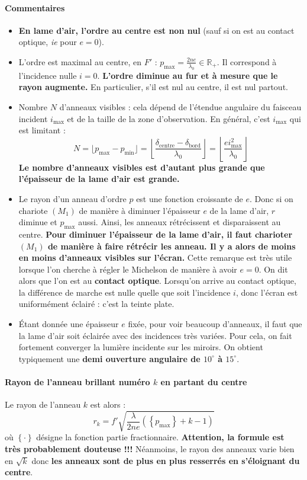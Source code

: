 \documentclass[french]{book}
\theoremstyle{plain}
\theoremstyle{definition}
\theoremstyle{remark}
\newcommand{\R}{\mathbb{R}}
\begin{document}
\paragraph{Commentaires}
\begin{itemize}
	\item \textbf{En lame d'air, l'ordre au centre est non nul} (sauf si on est au contact optique, \textit{ie} pour $e=0$).
	\item L'ordre est maximal au centre, en $F'$ : $p_\text{max}=\displaystyle\frac{2ne}{\lambda_0}\in\R_+$. Il correspond à l'incidence nulle $i=0$. \textbf{L'ordre diminue au fur et à mesure que le rayon augmente.} En particulier, s'il est nul au centre, il est nul partout.
	\item Nombre $N$ d'anneaux visibles : cela dépend de l'étendue angulaire du faisceau incident $i_\text{max}$ et de la taille de la zone d'observation. En général, c'est $i_\text{max}$ qui est limitant : $$N=\lfloor p_\text{max}-p_\text{min}\rfloor =\left\lfloor\frac{\delta_\text{centre}-\delta_\text{bord}}{\lambda_0}\right\rfloor =\left\lfloor \frac{ei_\text{max}^2}{\lambda_0}\right\rfloor$$ \textbf{Le nombre d'anneaux visibles est d'autant plus grande que l'épaisseur de la lame d'air est grande.}
	\item Le rayon d'un anneau d'ordre $p$ est une fonction croissante de $e$. Donc si on chariote $(M_1)$ de manière à diminuer l'épaisseur $e$ de la lame d'air, $r$ diminue et $p_\text{max}$ aussi. Ainsi, les anneaux rétrécissent et disparaissent au centre. \textbf{Pour diminuer l'épaisseur de la lame d'air, il faut charioter $(M_1)$ de manière à faire rétrécir les anneau. Il y a alors de moins en moins d'anneaux visibles sur l'écran.} Cette remarque est très utile lorsque l'on cherche à régler le Michelson de manière à avoir $e=0$. On dit alors que l'on est au \textbf{contact optique}. Lorsqu'on arrive au contact optique, la différence de marche est nulle quelle que soit l'incidence $i$, donc l'écran est uniformément éclairé : c'est la teinte plate.
	\item Étant donnée une épaisseur $e$ fixée, pour voir beaucoup d'anneaux, il faut que la lame d'air soit éclairée avec des incidences très variées. Pour cela, on fait fortement converger la lumière incidente sur les miroirs. On obtient typiquement une \textbf{demi ouverture angulaire de $10^\circ$ à $15^\circ$}.
\end{itemize}
\paragraph{Rayon de l'anneau brillant numéro $k$ en partant du centre}
Le rayon de l'anneau $k$ est alors : $$r_k=f'\sqrt{\frac{\lambda}{2ne}\left(\left\{p_\text{max}\right\}+k-1\right)}$$ où $\left\{\cdot\right\}$ désigne la fonction partie fractionnaire. \textbf{Attention, la formule est très probablement douteuse !!!} Néanmoins, le rayon des anneaux varie bien en $\sqrt{k}$ donc \textbf{les anneaux sont de plus en plus resserrés en s'éloignant du centre}.
\end{document}
